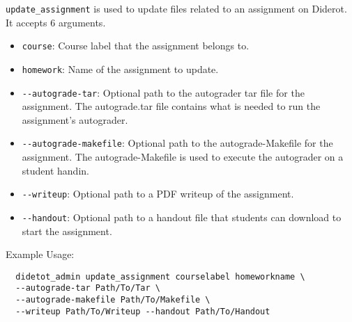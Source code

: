 \verb|update_assignment| is used to update files related to an assignment on Diderot.
%
It accepts 6 arguments.

\begin{itemize}
  \item \verb|course|: Course label that the assignment belongs to.
  \item \verb|homework|: Name of the assignment to update.
  \item \verb|--autograde-tar|: Optional path to the autograder tar file for the assignment. The autograde.tar file contains what is needed to run the assignment's autograder.
  \item \verb|--autograde-makefile|: Optional path to the autograde-Makefile for the assignment. The autograde-Makefile is used to execute the autograder on a student handin.
  \item \verb|--writeup|: Optional path to a PDF writeup of the assignment.
  \item \verb|--handout|: Optional path to a handout file that students can download to start the assignment.
\end{itemize}

Example Usage:
\begin{verbatim}
  didetot_admin update_assignment courselabel homeworkname \
  --autograde-tar Path/To/Tar \
  --autograde-makefile Path/To/Makefile \
  --writeup Path/To/Writeup --handout Path/To/Handout
\end{verbatim}

